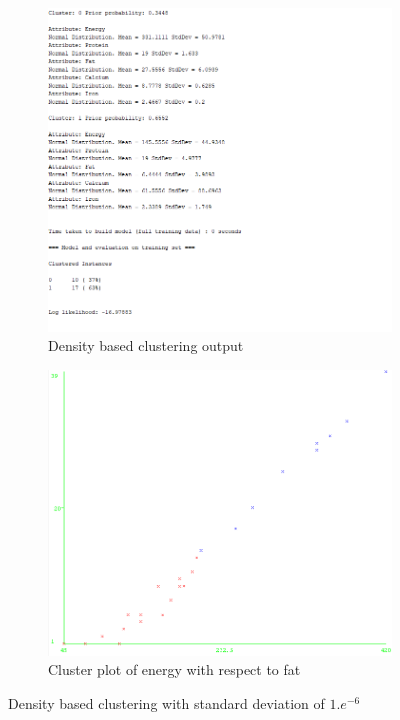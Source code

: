 \documentclass[letterpaper,12pt]{article}
\begin{document}
\begin{figure}[H]
\begin{subfigure}{.4\textwidth}
  \centering
  \includegraphics[width=.8\linewidth]{density_seed10_cl2_devE-6}  
  \caption{Density based clustering output}
  \label{fig:sub-first_4}
\end{subfigure}
\begin{subfigure}{.4\textwidth}
  \centering
  \includegraphics[width=.8\linewidth]{density_e6_energy_fat}  
  \caption{Cluster plot of energy with respect to fat}
  \label{fig:sub-second_4}
\end{subfigure}
\caption{Density based clustering with standard deviation of $1.e^{-6}$}
\label{fig:fig_4}
\end{figure}
\end{document}
